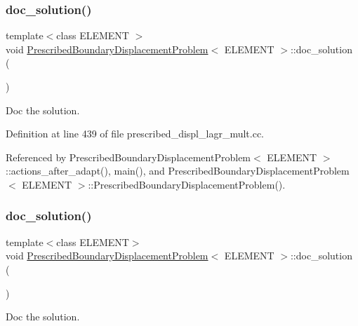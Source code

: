 \subsubsection{\texorpdfstring{doc\+\_\+solution()}{doc\_solution()}\hspace{0.1cm}{\footnotesize\ttfamily [2/3]}}
{\footnotesize\ttfamily template$<$class E\+L\+E\+M\+E\+NT $>$ \\
void \hyperlink{classPrescribedBoundaryDisplacementProblem}{Prescribed\+Boundary\+Displacement\+Problem}$<$ E\+L\+E\+M\+E\+NT $>$\+::doc\+\_\+solution (\begin{DoxyParamCaption}{ }\end{DoxyParamCaption})}



Doc the solution. 



Definition at line 439 of file prescribed\+\_\+displ\+\_\+lagr\+\_\+mult.\+cc.



Referenced by Prescribed\+Boundary\+Displacement\+Problem$<$ E\+L\+E\+M\+E\+N\+T $>$\+::actions\+\_\+after\+\_\+adapt(), main(), and Prescribed\+Boundary\+Displacement\+Problem$<$ E\+L\+E\+M\+E\+N\+T $>$\+::\+Prescribed\+Boundary\+Displacement\+Problem().

\mbox{\label{classPrescribedBoundaryDisplacementProblem_abc58821d6b49cd9773dcd90b240aab6e}} 
\subsubsection{\texorpdfstring{doc\+\_\+solution()}{doc\_solution()}\hspace{0.1cm}{\footnotesize\ttfamily [3/3]}}
{\footnotesize\ttfamily template$<$class E\+L\+E\+M\+E\+NT$>$ \\
void \hyperlink{classPrescribedBoundaryDisplacementProblem}{Prescribed\+Boundary\+Displacement\+Problem}$<$ E\+L\+E\+M\+E\+NT $>$\+::doc\+\_\+solution (\begin{DoxyParamCaption}{ }\end{DoxyParamCaption})}



Doc the solution. 

